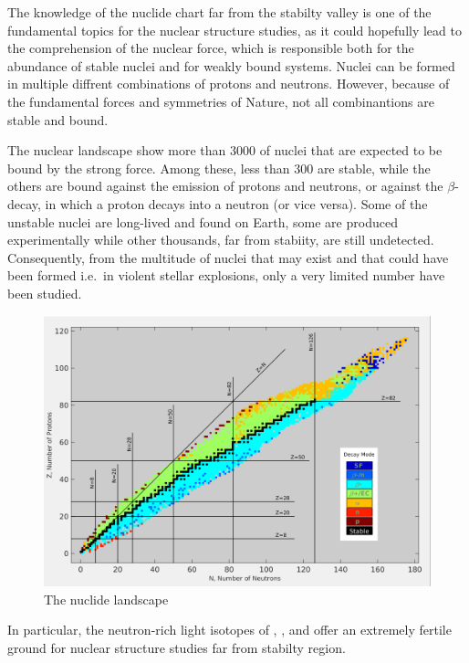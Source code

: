 The knowledge of the nuclide chart far from the stabilty valley is one of the
fundamental topics for the nuclear structure studies, as it could hopefully
lead to the comprehension of the nuclear force, which is responsible both for
the abundance of stable nuclei and for weakly bound systems.
Nuclei can be formed in multiple diffrent combinations of protons and neutrons.
However, because of the fundamental forces and symmetries of Nature, not all
combinantions are stable and bound.

\bigbreak

The nuclear landscape show more than $3000$ of nuclei that are expected to be
bound by the strong force. Among these, less than $300$ are stable, while the
others are bound against the emission of protons and neutrons, or against the
$\beta$-decay, in which a proton decays into a neutron (or vice versa). Some
of the unstable nuclei are long-lived and found on Earth, some are produced
experimentally while other thousands, far from stabiity, are still undetected.
Consequently, from the multitude of nuclei that may exist and that could have
been formed i.e.\ in violent stellar explosions, only a very limited number
have been studied.

\bigbreak

\begin{figure}[h]
  \centering
  \includegraphics[scale=.35]{img/DecayModeNuDat2.png}
  \caption{The nuclide landscape}
  \label{nucl}
\end{figure}

\bigbreak

In particular, the neutron-rich light isotopes of , ,  and
 offer an extremely fertile ground for nuclear structure studies far
from stabilty region.

